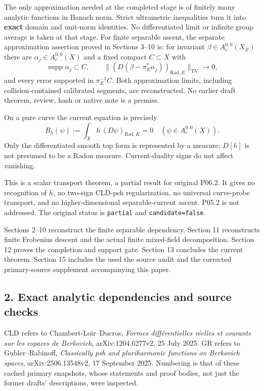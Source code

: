 \documentclass[
  11pt,
]{article}
\newcommand{\passthrough}[1]{#1}
\begin{document}
The only approximation needed at the completed stage is of finitely many
analytic functions in Banach norm. Strict ultrametric inequalities turn
it into \textbf{exact} domain and unit-norm identities. No
differentiated limit or infinite group average is taken at that stage.
For finite separable ascent, the separate approximation assertion proved
in Sections 3--10 is: for invariant \(\beta\in A_c^{0,0}(X_E)\) there
are \(\alpha_j\in A_c^{0,0}(X)\) and a fixed compact \(C\subset X\) with
\[
 \operatorname{supp}\alpha_j\subset C,\qquad
 \big\|(D(\beta-\pi_E^*\alpha_j))_{\mathrm{Rad},E}\big\|_{\mathrm{TV}}
                 \longrightarrow0,                  \tag{2}
\] and every error supported in \(\pi_E^{-1}C\). Both approximation
limits, including collision-contained calibrated segments, are
reconstructed. No earlier draft theorem, review, hash or native note is
a premise.

On a pure curve the current equation is precisely \[
 B_h(\psi):=\int_X h\,(D\psi)_{\mathrm{Rad},K}=0
                  \quad(\psi\in A_c^{0,0}(X)).         \tag{3}
\] Only the differentiated smooth top form is represented by a measure;
\(D[h]\) is not presumed to be a Radon measure. Current-duality signs do
not affect vanishing.

This is a scalar transport theorem, a partial result for original P06.2.
It gives no recognition of \(h\), no two-sign CLD-psh regularization, no
universal curve-probe transport, and no higher-dimensional
separable-current ascent. P05.2 is not addressed. The original status is
\passthrough{\lstinline!partial!} and
\passthrough{\lstinline!candidate=false!}.

Sections 2--10 reconstruct the finite separable dependency. Section 11
reconstructs finite Frobenius descent and the actual finite mixed-field
decomposition. Section 12 proves the completion and support gate.
Section 13 concludes the current theorem. Section 15 includes the used
the source audit and the corrected primary-source supplement accompanying this paper.

\subsection{2. Exact analytic dependencies and source
checks}\label{exact-analytic-dependencies-and-source-checks}

CLD refers to Chambert-Loir--Ducros, \emph{Formes différentielles
réelles et courants sur les espaces de Berkovich}, arXiv:1204.6277v2, 25
July 2025. GR refers to Gubler--Rabinoff, \emph{Classically psh and
pluriharmonic functions on Berkovich spaces}, arXiv:2506.13548v2, 17
September 2025. Numbering is that of these cached primary snapshots,
whose statements and proof bodies, not just the former drafts'
descriptions, were inspected.
\end{document}
